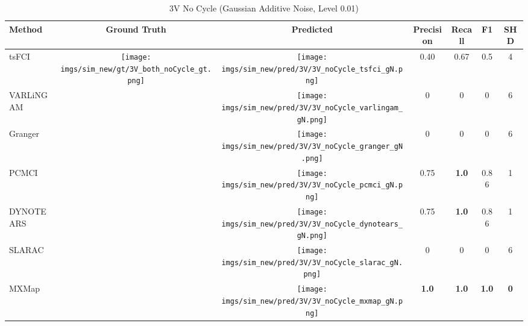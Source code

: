 \begin{table}[htb]
\begin{tabular}{l|c|c|c|c|c|c}
Method    & Ground Truth      & Predicted & Precision    & Recall       & F1           & SHD        \\ \hline
tsFCI     & \multirow{7}{*}[-6.2em]{\begin{minipage}{.17\linewidth} \centering \texttt{[image: imgs/sim\_new/gt/3V\_both\_noCycle\_gt.png]} \end{minipage}} & \begin{minipage}{.17\linewidth} \centering \texttt{[image: imgs/sim\_new/pred/3V/3V\_noCycle\_tsfci\_gN.png]} \end{minipage}          & 0.40         & 0.67         & 0.5          & 4          \\
VARLiNGAM &                   & \begin{minipage}{.17\linewidth} \centering \texttt{[image: imgs/sim\_new/pred/3V/3V\_noCycle\_varlingam\_gN.png]} \end{minipage} & 0            & 0            & 0            & 6          \\
Granger   &                   & \begin{minipage}{.17\linewidth} \centering \texttt{[image: imgs/sim\_new/pred/3V/3V\_noCycle\_granger\_gN.png]} \end{minipage} & 0            & 0            & 0            & 6          \\
PCMCI     &                   & \begin{minipage}{.17\linewidth} \centering \texttt{[image: imgs/sim\_new/pred/3V/3V\_noCycle\_pcmci\_gN.png]} \end{minipage} & 0.75         & \textbf{1.0} & 0.86         & 1          \\
DYNOTEARS &                   & \begin{minipage}{.17\linewidth} \centering \texttt{[image: imgs/sim\_new/pred/3V/3V\_noCycle\_dynotears\_gN.png]} \end{minipage}& 0.75         & \textbf{1.0} & 0.86         & 1          \\
SLARAC    &                   & \begin{minipage}{.17\linewidth} \centering \texttt{[image: imgs/sim\_new/pred/3V/3V\_noCycle\_slarac\_gN.png]} \end{minipage} & 0            & 0            & 0            & 6          \\ \cline{1-1} \cline{3-7} 
MXMap     &                   & \begin{minipage}{.17\linewidth} \centering \texttt{[image: imgs/sim\_new/pred/3V/3V\_noCycle\_mxmap\_gN.png]} \end{minipage} & \textbf{1.0} & \textbf{1.0} & \textbf{1.0} & \textbf{0}
\end{tabular}
\caption{3V No Cycle (Gaussian Additive Noise, Level 0.01)}
\label{tab:3V_noCycle_gN}
\end{table}

